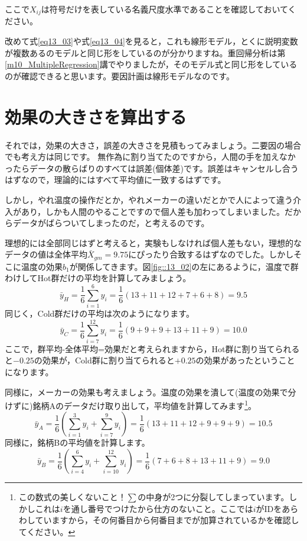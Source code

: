 \documentclass{ltjbook}
\begin{document}
ここで$X_{ij}$は符号だけを表している名義尺度水準であることを確認しておいてください。

改めて式\ref{eq13_03}や式\ref{eq13_04}を見ると，これも線形モデル，とくに説明変数が複数あるのモデルと同じ形をしているのが分かりますね。重回帰分析は第\ref{m10_MultipleRegression}講でやりましたが，そのモデル式と同じ形をしているのが確認できると思います。要因計画は線形モデルなのです。


\section{効果の大きさを算出する}

それでは，効果の大きさ，誤差の大きさを見積もってみましょう。二要因の場合でも考え方は同じです。
無作為に割り当てたのですから，人間の手を加えなかったらデータの散らばりのすべては誤差(個体差)です。誤差はキャンセルし合うはずなので，理論的にはすべて平均値に一致するはずです。

しかし，やれ温度の操作だとか，やれメーカーの違いだとかで人によって違う介入があり，しかも人間のやることですので個人差も加わってしまいました。だからデータがばらついてしまったのだ，と考えるのです。

理想的には全部同じはずと考えると，実験もしなければ個人差もない，理想的なデータの値は全体平均$\bar{X}_{gm} = 9.75$にぴったり合致するはずなのでした。しかしそこに温度の効果$b_1$が関係してきます。図\ref{fig::13_02}の左にあるように，温度で群わけしてHot群だけの平均を計算してみましょう。
\[ \bar{y}_{H} = \frac{1}{6}\sum_{i=1}^6 y_i = \frac{1}{6} (13+11+12+7+6+8)= 9.5 \]
同じく，Cold群だけの平均は次のようになります。
\[ \bar{y}_{C} = \frac{1}{6}\sum_{i=7}^{12}y_i = \frac{1}{6}(9+9+9+13+11+9) = 10.0 \]
ここで，群平均-全体平均=効果だと考えられますから，Hot群に割り当てられると$-0.25$の効果が，Cold群に割り当てられると$+0.25$の効果があったということになります。

同様に，メーカーの効果も考えましょう。温度の効果を潰して(温度の効果で分けずに)銘柄Aのデータだけ取り出して，平均値を計算してみます\footnote{この数式の美しくないこと！$\sum$の中身が2つに分裂してしまっています。しかしこれは$i$を通し番号でつけたから仕方のないこと。ここでは$i$がIDをあらわしていますから，その何番目から何番目までが加算されているかを確認してください。}。
\[ \bar{y}_{A} = \frac{1}{6}\left(\sum_{i=1}^3y_{i} + \sum_{i=7}^9y_i \right)= \frac{1}{6}(13+11+12+9+9+9) = 10.5 \]
同様に，銘柄Bの平均値を計算します。
\[ \bar{y}_{B} = \frac{1}{6}\left(\sum_{i=4}^6y_i + \sum_{i=10}^{12}y_i \right) =\frac{1}{6}(7+6+8+13+11+9)= 9.0 \]
\end{document}
